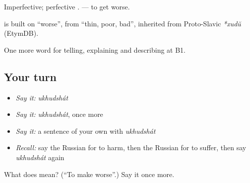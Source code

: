 Imperfective; perfective \emph{}. \emph{} — to get worse.

\begin{cousinweb}
\textbf{} is built on \emph{} \textquotedblleft{}worse\textquotedblright{}, from \emph{} \textquotedblleft{}thin, poor, bad\textquotedblright{}, inherited from Proto-Slavic \emph{*xudŭ} (EtymDB).
\end{cousinweb}

\begin{grammarlens}[title={What you've built}]
One more word for telling, explaining and describing at B1.
\end{grammarlens}

\subsection*{Your turn}
\begin{itemize}
\raggedright
  \item \emph{Say it:} \emph{ukhudshát}
  \item \emph{Say it:} \emph{ukhudshát}, once more
  \item \emph{Say it:} a sentence of your own with \emph{ukhudshát}
  \item \emph{Recall:} say the Russian for to harm, then the Russian for to suffer, then say \emph{ukhudshát} again
\end{itemize}

\begin{tcolorbox}[breakable,colback=teal!4,colframe=teal!35!black,title={Before you move on}]
What does  mean? (\textquotedblleft{}To make worse\textquotedblright{}.) Say it once more.
\end{tcolorbox}
